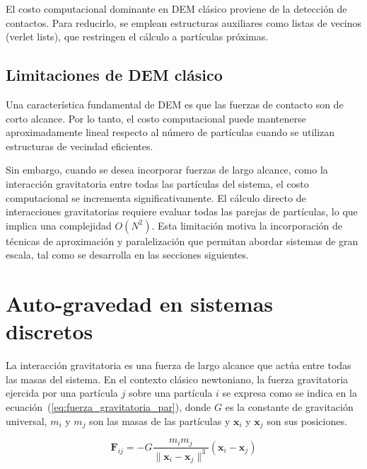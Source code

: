 \documentclass[a4paper,11pt]{book}
\newcommand{\red}[1]{\textcolor{red}{#1}}
\begin{document}
El costo computacional dominante en DEM clásico proviene de la detección de contactos. Para reducirlo, se emplean estructuras auxiliares como listas de vecinos (verlet lists), que restringen el cálculo a partículas próximas.

\subsection{Limitaciones de DEM clásico}

Una característica fundamental de DEM es que las fuerzas de contacto son de corto alcance. Por lo tanto, el costo computacional puede mantenerse aproximadamente lineal respecto al número de partículas cuando se utilizan estructuras de vecindad eficientes.

Sin embargo, cuando se desea incorporar fuerzas de largo alcance, como la interacción gravitatoria entre todas las partículas del sistema, el costo computacional se incrementa significativamente. El cálculo directo de interacciones gravitatorias requiere evaluar todas las parejas de partículas, lo que implica una complejidad $O(N^2)$. Esta limitación motiva la incorporación de técnicas de aproximación y paralelización que permitan abordar sistemas de gran escala, tal como se desarrolla en las secciones siguientes.

\section{Auto-gravedad en sistemas discretos}

La interacción gravitatoria es una fuerza de largo alcance que actúa entre todas las masas del sistema. En el contexto clásico newtoniano, la fuerza gravitatoria ejercida por una partícula $j$ sobre una partícula $i$ se expresa como se indica en la ecuación~(\ref{eq:fuerza_gravitatoria_par}), donde $G$ es la constante de gravitación universal, $m_i$ y $m_j$ son las masas de las partículas y $\mathbf{x}_i$ y $\mathbf{x}_j$ son sus posiciones.

\begin{equation}
	\mathbf{F}_{ij} = - G \frac{m_i m_j}{\|\mathbf{x}_i - \mathbf{x}_j\|^3} (\mathbf{x}_i - \mathbf{x}_j)
	\label{eq:fuerza_gravitatoria_par}
\end{equation}


\end{document}
